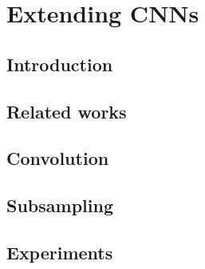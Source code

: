 \section{Extending CNNs}

\subsection{Introduction}

\subsection{Related works}

\subsection{Convolution}

\subsection{Subsampling}

\subsection{Experiments}